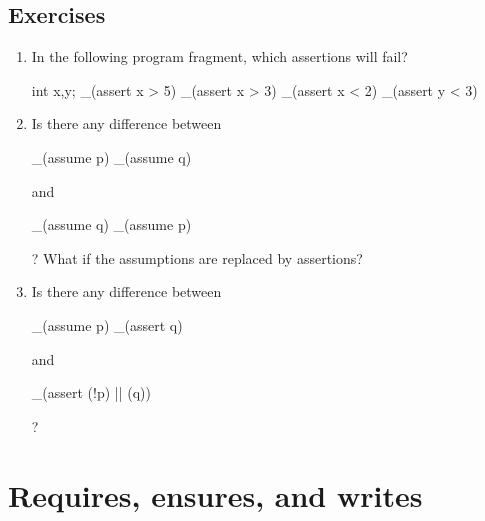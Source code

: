 \subsection*{Exercises}
\begin{enumerate}
\item
In the following program fragment, which assertions will fail?
\begin{VCC}
int x,y; 
_(assert x > 5) 
_(assert x > 3) 
_(assert x < 2) 
_(assert y < 3)
\end{VCC}
\item
Is there any difference between 
\begin{VCC}
_(assume p)
_(assume q)
\end{VCC}
and 
\begin{VCC}
_(assume q) 
_(assume p)
\end{VCC}
? What if the assumptions are replaced by assertions?
\item
Is there any difference between
\begin{VCC}
_(assume p)
_(assert q)
\end{VCC}
and 
\begin{VCC}
_(assert (!p) || (q))
\end{VCC}
? 

\end{enumerate}

\section{Requires, ensures, and writes}
\label{sect:functions}

